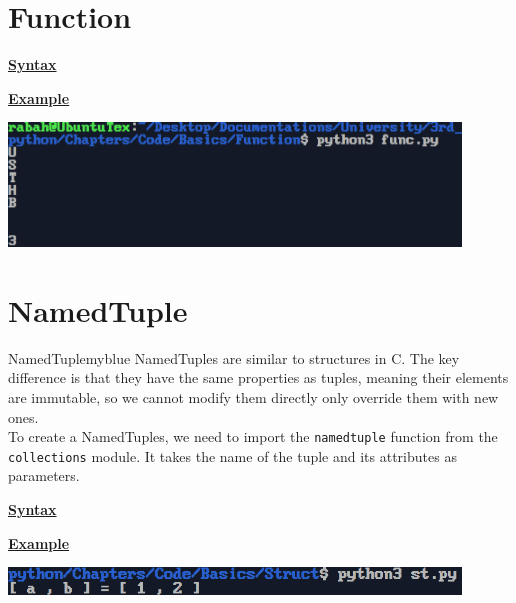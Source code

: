 \newpage
\section{Function}
\textbf{\underline{Syntax}}\\[0.1cm]



\vspace{0.5cm}

\textbf{\underline{Example}}\\[0.1cm]


\vspace{0.35cm}
\begin{center}
    \includegraphics[width = 0.9\textwidth]{Chapters/ScreenShot/Basics/Function/funcOutput.png}
\end{center}

\newpage

\section{NamedTuple}
\begin{prettyBox}{NamedTuple}{myblue}
NamedTuples are similar to structures in C. The key difference is that they have the same properties as tuples, meaning their elements are immutable, so we cannot modify them directly only override them with new ones.\\[0.05cm]
To create a NamedTuples, we need to import the \texttt{namedtuple} function from the \texttt{collections} module. It takes the name of the tuple and its attributes as parameters.
\end{prettyBox}

\vspace{1cm}
\textbf{\underline{Syntax}}\\[0.1cm]


\vspace{0.5cm}

\textbf{\underline{Example}}\\[0.1cm]


\vspace{0.35cm}
\begin{center}
    \includegraphics[width = 0.9\textwidth]{Chapters/ScreenShot/Basics/Struct/stOutput.png}
\end{center}


